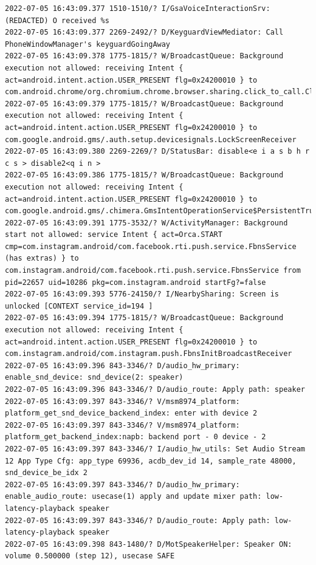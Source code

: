 \documentclass[a4paper,12pt]{book}
\begin{document}
\begin{lstlisting}
2022-07-05 16:43:09.377 1510-1510/? I/GsaVoiceInteractionSrv: (REDACTED) O received %s
2022-07-05 16:43:09.377 2269-2492/? D/KeyguardViewMediator: Call PhoneWindowManager's keyguardGoingAway
2022-07-05 16:43:09.378 1775-1815/? W/BroadcastQueue: Background execution not allowed: receiving Intent { act=android.intent.action.USER_PRESENT flg=0x24200010 } to com.android.chrome/org.chromium.chrome.browser.sharing.click_to_call.ClickToCallMessageHandler$PhoneUnlockedReceiver
2022-07-05 16:43:09.379 1775-1815/? W/BroadcastQueue: Background execution not allowed: receiving Intent { act=android.intent.action.USER_PRESENT flg=0x24200010 } to com.google.android.gms/.auth.setup.devicesignals.LockScreenReceiver
2022-07-05 16:43:09.380 2269-2269/? D/StatusBar: disable<e i a s b h r c s > disable2<q i n >
2022-07-05 16:43:09.386 1775-1815/? W/BroadcastQueue: Background execution not allowed: receiving Intent { act=android.intent.action.USER_PRESENT flg=0x24200010 } to com.google.android.gms/.chimera.GmsIntentOperationService$PersistentTrustedReceiver
2022-07-05 16:43:09.391 1775-3532/? W/ActivityManager: Background start not allowed: service Intent { act=Orca.START cmp=com.instagram.android/com.facebook.rti.push.service.FbnsService (has extras) } to com.instagram.android/com.facebook.rti.push.service.FbnsService from pid=22657 uid=10286 pkg=com.instagram.android startFg?=false
2022-07-05 16:43:09.393 5776-24150/? I/NearbySharing: Screen is unlocked [CONTEXT service_id=194 ]
2022-07-05 16:43:09.394 1775-1815/? W/BroadcastQueue: Background execution not allowed: receiving Intent { act=android.intent.action.USER_PRESENT flg=0x24200010 } to com.instagram.android/com.instagram.push.FbnsInitBroadcastReceiver
2022-07-05 16:43:09.396 843-3346/? D/audio_hw_primary: enable_snd_device: snd_device(2: speaker)
2022-07-05 16:43:09.396 843-3346/? D/audio_route: Apply path: speaker
2022-07-05 16:43:09.397 843-3346/? V/msm8974_platform: platform_get_snd_device_backend_index: enter with device 2
2022-07-05 16:43:09.397 843-3346/? V/msm8974_platform: platform_get_backend_index:napb: backend port - 0 device - 2 
2022-07-05 16:43:09.397 843-3346/? I/audio_hw_utils: Set Audio Stream 12 App Type Cfg: app_type 69936, acdb_dev_id 14, sample_rate 48000, snd_device_be_idx 2
2022-07-05 16:43:09.397 843-3346/? D/audio_hw_primary: enable_audio_route: usecase(1) apply and update mixer path: low-latency-playback speaker
2022-07-05 16:43:09.397 843-3346/? D/audio_route: Apply path: low-latency-playback speaker
2022-07-05 16:43:09.398 843-1480/? D/MotSpeakerHelper: Speaker ON: volume 0.500000 (step 12), usecase SAFE

\end{lstlisting}
\end{document}
